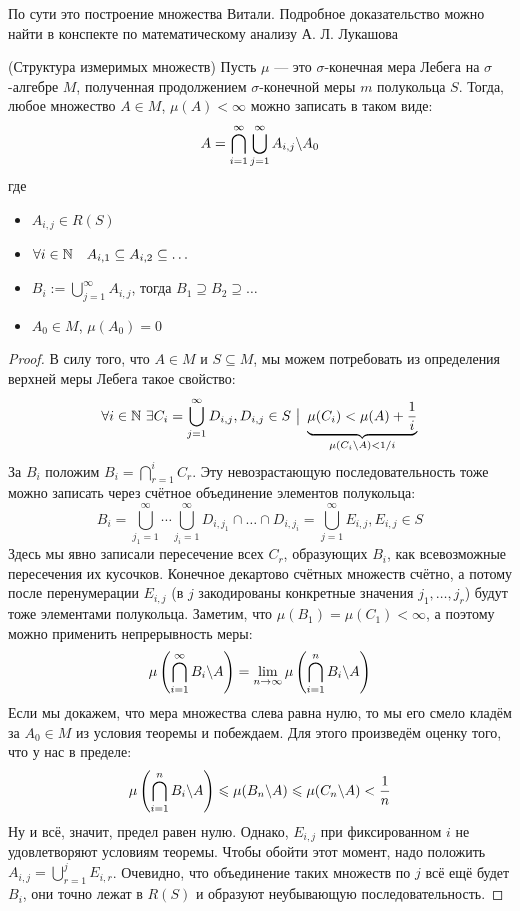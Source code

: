 \begin{note}
	По сути это построение множества Витали. Подробное доказательство можно найти в конспекте по математическому анализу А. Л. Лукашова
\end{note}

\begin{theorem} (Структура измеримых множеств)
	Пусть $\mu$ --- это $\sigma$-конечная мера Лебега на $\sigma$-алгебре $M$, полученная продолжением $\sigma$-конечной меры $m$ полукольца $S$. Тогда, любое множество $A \in M$, $\mu(A) < \infty$ можно записать в таком виде:
	\[
		A = \bigcap_{i = 1}^\infty \bigcup_{j = 1}^\infty A_{i, j} \backslash A_0
	\]
	где
	\begin{itemize}
		\item $A_{i, j} \in R(S)$
		
		\item $\forall i \in \mathbb{N} \quad A_{i, 1} \subseteq A_{i, 2} \subseteq \ldots$
		
		\item $B_i := \bigcup_{j = 1}^\infty A_{i, j}$, тогда $B_1 \supseteq B_2 \supseteq \ldots$
		
		\item $A_0 \in M$, $\mu(A_0) = 0$
	\end{itemize}
\end{theorem}

\begin{proof}
	В силу того, что $A \in M$ и $S \subseteq M$, мы можем потребовать из определения верхней меры Лебега такое свойство:
	\[
		\forall i \in \mathbb{N}\ \exists C_i = \bigcup_{j = 1}^\infty D_{i, j}, D_{i, j} \in S \ \big|\  \underbrace{\mu(C_i) < \mu(A) + \frac{1}{i}}_{\mu(C_i \backslash A) < 1 / i}
	\]
	За $B_i$ положим $B_i = \bigcap_{r = 1}^i C_r$. Эту невозрастающую последовательность тоже можно записать через счётное объединение элементов полукольца:
	\[
		B_i = \bigcup_{j_1 = 1}^\infty \cdots \bigcup_{j_i = 1}^\infty D_{i, j_1} \cap \ldots \cap D_{i, j_i} = \bigcup_{j = 1}^\infty E_{i, j}, E_{i, j} \in S
	\]
	Здесь мы явно записали пересечение всех $C_r$, образующих $B_i$, как всевозможные пересечения их кусочков. Конечное декартово счётных множеств счётно, а потому после перенумерации $E_{i, j}$ (в $j$ закодированы конкретные значения $j_1, \ldots, j_r$) будут тоже элементами полукольца. Заметим, что $\mu(B_1) = \mu(C_1) < \infty$, а поэтому можно применить непрерывность меры:
	\[
		\mu\left(\bigcap_{i = 1}^\infty B_i \backslash A\right) = \lim_{n \to \infty} \mu\left(\bigcap_{i = 1}^n B_i \backslash A\right)
	\]
	Если мы докажем, что мера множества слева равна нулю, то мы его смело кладём за $A_0 \in M$ из условия теоремы и побеждаем. Для этого произведём оценку того, что у нас в пределе:
	\[
		\mu\left(\bigcap_{i = 1}^n B_i \backslash A\right) \leqslant \mu(B_n \backslash A) \leqslant \mu(C_n \backslash A) < \frac{1}{n}
	\]
	Ну и всё, значит, предел равен нулю. Однако, $E_{i, j}$ при фиксированном $i$ не удовлетворяют условиям теоремы. Чтобы обойти этот момент, надо положить $A_{i, j} = \bigcup_{r = 1}^j E_{i, r}$. Очевидно, что объединение таких множеств по $j$ всё ещё будет $B_i$, они точно лежат в $R(S)$ и образуют неубывающую последовательность.
\end{proof}

